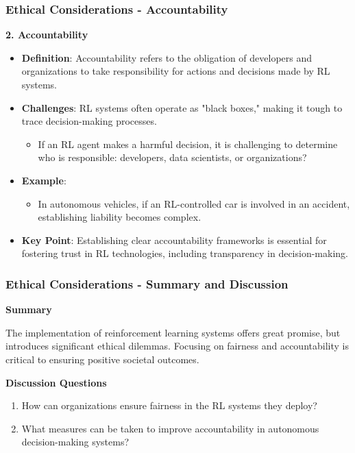 \documentclass[aspectratio=169]{beamer}
\begin{document}
\begin{frame}[fragile]
  \frametitle{Ethical Considerations - Accountability}

  \textbf{2. Accountability}
  
  \begin{itemize}
    \item \textbf{Definition}: Accountability refers to the obligation of developers and organizations to take responsibility for actions and decisions made by RL systems.
    
    \item \textbf{Challenges}: RL systems often operate as "black boxes," making it tough to trace decision-making processes. 
    \begin{itemize}
      \item If an RL agent makes a harmful decision, it is challenging to determine who is responsible: developers, data scientists, or organizations?
    \end{itemize}
    
    \item \textbf{Example}: 
    \begin{itemize}
      \item In autonomous vehicles, if an RL-controlled car is involved in an accident, establishing liability becomes complex.
    \end{itemize}
    
    \item \textbf{Key Point}: Establishing clear accountability frameworks is essential for fostering trust in RL technologies, including transparency in decision-making.
  \end{itemize}
\end{frame}

\begin{frame}[fragile]
  \frametitle{Ethical Considerations - Summary and Discussion}

  \textbf{Summary}
  
  The implementation of reinforcement learning systems offers great promise, but introduces significant ethical dilemmas. Focusing on fairness and accountability is critical to ensuring positive societal outcomes.

  \textbf{Discussion Questions}
  \begin{enumerate}
    \item How can organizations ensure fairness in the RL systems they deploy?
    \item What measures can be taken to improve accountability in autonomous decision-making systems?
  \end{enumerate}
\end{frame}
\end{document}
